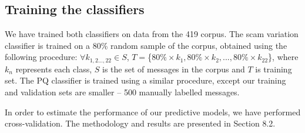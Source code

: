 \begin{table}[h]
  \centering
   \caption{Feature selection: scam variation classifier vs. PQ classifier}
\end{table}

\subsection{Training the classifiers}
We have trained both classifiers on data from the 419 corpus.  The scam variation classifier is trained on a 80\% random sample of the corpus, obtained using the following procedure: $\forall k_{1,2...,22} \in S$, $T=$\{$80\% \times k_{1}, 80\% \times k_{2},..., 80\% \times k_{22}$\}, where $k_{n}$ represents each class, $S$ is the set of messages in the corpus and $T$ is training set. The PQ classifier is trained using a similar procedure, except our training and validation sets are smaller -- 500 manually labelled messages.

In order to estimate the performance of our predictive models, we have performed cross-validation. The methodology and results are presented in Section 8.2.